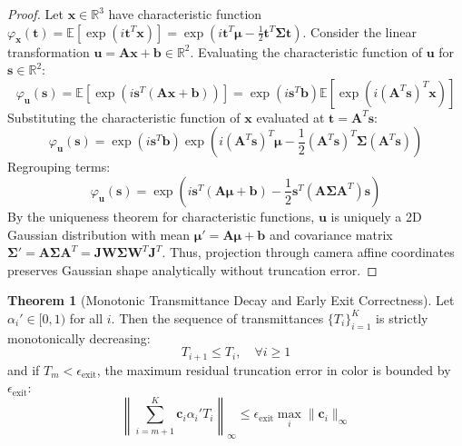 \documentclass[11pt,a4paper]{article}
\theoremstyle{definition}
\newtheorem{theorem}{\textbf{Theorem}}[section]
\begin{document}
\begin{proof}
Let $\mathbf{x} \in \mathbb{R}^3$ have characteristic function $\varphi_\mathbf{x}(\mathbf{t}) = \mathbb{E}[\exp(i \mathbf{t}^T \mathbf{x})] = \exp\left( i \mathbf{t}^T \boldsymbol{\mu} - \frac{1}{2} \mathbf{t}^T \boldsymbol{\Sigma} \mathbf{t} \right)$.
Consider the linear transformation $\mathbf{u} = \mathbf{A} \mathbf{x} + \mathbf{b} \in \mathbb{R}^2$.
Evaluating the characteristic function of $\mathbf{u}$ for $\mathbf{s} \in \mathbb{R}^2$:
{\boldmath
\begin{equation}
\varphi_\mathbf{u}(\mathbf{s}) = \mathbb{E}\left[ \exp\left( i \mathbf{s}^T (\mathbf{A}\mathbf{x} + \mathbf{b}) \right) \right] = \exp(i \mathbf{s}^T \mathbf{b}) \mathbb{E}\left[ \exp\left( i (\mathbf{A}^T \mathbf{s})^T \mathbf{x} \right) \right]
\end{equation}
}
Substituting the characteristic function of $\mathbf{x}$ evaluated at $\mathbf{t} = \mathbf{A}^T \mathbf{s}$:
{\boldmath
\begin{equation}
\varphi_\mathbf{u}(\mathbf{s}) = \exp(i \mathbf{s}^T \mathbf{b}) \exp\left( i (\mathbf{A}^T \mathbf{s})^T \boldsymbol{\mu} - \frac{1}{2} (\mathbf{A}^T \mathbf{s})^T \boldsymbol{\Sigma} (\mathbf{A}^T \mathbf{s}) \right)
\end{equation}
}
Regrouping terms:
{\boldmath
\begin{equation}
\varphi_\mathbf{u}(\mathbf{s}) = \exp\left( i \mathbf{s}^T (\mathbf{A}\boldsymbol{\mu} + \mathbf{b}) - \frac{1}{2} \mathbf{s}^T (\mathbf{A} \boldsymbol{\Sigma} \mathbf{A}^T) \mathbf{s} \right)
\end{equation}
}
By the uniqueness theorem for characteristic functions, $\mathbf{u}$ is uniquely a 2D Gaussian distribution with mean $\boldsymbol{\mu}' = \mathbf{A}\boldsymbol{\mu} + \mathbf{b}$ and covariance matrix $\boldsymbol{\Sigma}' = \mathbf{A} \boldsymbol{\Sigma} \mathbf{A}^T = \mathbf{J} \mathbf{W} \boldsymbol{\Sigma} \mathbf{W}^T \mathbf{J}^T$.
Thus, projection through camera affine coordinates preserves Gaussian shape analytically without truncation error.
\end{proof}

\begin{theorem}[Monotonic Transmittance Decay and Early Exit Correctness]
Let $\alpha_i' \in [0, 1)$ for all $i$. Then the sequence of transmittances $\{T_i\}_{i=1}^K$ is strictly monotonically decreasing:
{\boldmath
\begin{equation}
T_{i+1} \le T_i, \quad \forall i \ge 1
\end{equation}
}
and if $T_m < \epsilon_{\text{exit}}$, the maximum residual truncation error in color is bounded by $\epsilon_{\text{exit}}$:
{\boldmath
\begin{equation}
\left\| \sum_{i=m+1}^K \mathbf{c}_i \alpha_i' T_i \right\|_\infty \le \epsilon_{\text{exit}} \max_{i} \|\mathbf{c}_i\|_\infty
\end{equation}
}
\end{theorem}
\end{document}
